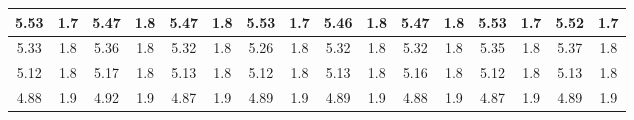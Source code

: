 \begin{table}[H]
{\begin{tabular}{|cccccccccccccccc|}
\multicolumn{1}{|c|}{5.53}    & \multicolumn{1}{c|}{1.7}                                & \multicolumn{1}{c|}{5.47}    & \multicolumn{1}{c|}{1.8}                                & \multicolumn{1}{c|}{5.47}    & \multicolumn{1}{c|}{1.8}                                & \multicolumn{1}{c|}{5.53}     & \multicolumn{1}{c|}{1.7}                                 & \multicolumn{1}{c|}{5.46}     & \multicolumn{1}{c|}{1.8}                                 & \multicolumn{1}{c|}{5.47}     & \multicolumn{1}{c|}{1.8}                                 & \multicolumn{1}{c|}{5.53}     & \multicolumn{1}{c|}{1.7}                                 & \multicolumn{1}{c|}{5.52}     & 1.7                                 \\ \hline
\multicolumn{1}{|c|}{5.33}    & \multicolumn{1}{c|}{1.8}                                & \multicolumn{1}{c|}{5.36}    & \multicolumn{1}{c|}{1.8}                                & \multicolumn{1}{c|}{5.32}    & \multicolumn{1}{c|}{1.8}                                & \multicolumn{1}{c|}{5.26}     & \multicolumn{1}{c|}{1.8}                                 & \multicolumn{1}{c|}{5.32}     & \multicolumn{1}{c|}{1.8}                                 & \multicolumn{1}{c|}{5.32}     & \multicolumn{1}{c|}{1.8}                                 & \multicolumn{1}{c|}{5.35}     & \multicolumn{1}{c|}{1.8}                                 & \multicolumn{1}{c|}{5.37}     & 1.8                                 \\ \hline
\multicolumn{1}{|c|}{5.12}    & \multicolumn{1}{c|}{1.8}                                & \multicolumn{1}{c|}{5.17}    & \multicolumn{1}{c|}{1.8}                                & \multicolumn{1}{c|}{5.13}    & \multicolumn{1}{c|}{1.8}                                & \multicolumn{1}{c|}{5.12}     & \multicolumn{1}{c|}{1.8}                                 & \multicolumn{1}{c|}{5.13}     & \multicolumn{1}{c|}{1.8}                                 & \multicolumn{1}{c|}{5.16}     & \multicolumn{1}{c|}{1.8}                                 & \multicolumn{1}{c|}{5.12}     & \multicolumn{1}{c|}{1.8}                                 & \multicolumn{1}{c|}{5.13}     & 1.8                                 \\ \hline
\multicolumn{1}{|c|}{4.88}    & \multicolumn{1}{c|}{1.9}                                & \multicolumn{1}{c|}{4.92}    & \multicolumn{1}{c|}{1.9}                                & \multicolumn{1}{c|}{4.87}    & \multicolumn{1}{c|}{1.9}                                & \multicolumn{1}{c|}{4.89}     & \multicolumn{1}{c|}{1.9}                                 & \multicolumn{1}{c|}{4.89}     & \multicolumn{1}{c|}{1.9}                                 & \multicolumn{1}{c|}{4.88}     & \multicolumn{1}{c|}{1.9}                                 & \multicolumn{1}{c|}{4.87}     & \multicolumn{1}{c|}{1.9}                                 & \multicolumn{1}{c|}{4.89}     & 1.9                                 \\ \hline

\end{tabular}}
\end{table}
